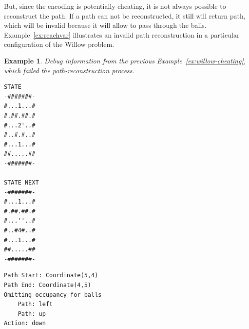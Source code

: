 \documentclass{report}
\theoremstyle{plain}
\newtheorem{example}{Example}[section]
\begin{document}
\vspace{1\baselineskip}

But, since the encoding is potentially cheating, it is not always possible to reconstruct the path. If a path can not be reconstructed, it still will return path, which will be invalid because it will allow to pass through the balls. Example~\ref{ex:reachvar} illustrates an invalid path reconstruction in a particular configuration of the Willow problem.

\vspace{1\baselineskip}

\newpage

\begin{example}
\label{ex:path}
Debug information from the previous Example~\ref{ex:willow-cheating}, which failed the path-reconstruction process.

\begin{center}
\begin{minipage}{0.4\textwidth}
\begin{verbatim}
STATE
-#######-
#...1...#
#.##.##.#
#...2'..#
#..#.#..#
#...1...#
##.....##
-#######-

STATE NEXT
-#######-
#...1...#
#.##.##.#
#...''..#
#..#4#..#
#...1...#
##.....##
-#######-
\end{verbatim}
\end{minipage}
\begin{minipage}{0.4\textwidth}
\begin{verbatim}
Path Start: Coordinate(5,4)
Path End: Coordinate(4,5)
Omitting occupancy for balls
    Path: left
    Path: up
Action: down
\end{verbatim}
\end{minipage}
\end{center}
\end{example}

\vspace{1\baselineskip}
\end{document}
